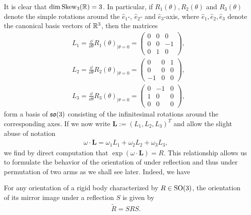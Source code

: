 It is clear that $\dim \operatorname{Skew}_3(\mathbb{R}) = 3$. In particular, if $R_1(\theta), R_2(\theta)$ and $R_3(\theta)$ denote the simple rotations around the $\hat{e}_1$-, $\hat{e}_2$- and $\hat{e}_3$-axis, where $\hat{e}_1, \hat{e}_2, \hat{e}_3$ denote the canonical basis vectors of $\mathbb{R}^3$, then the matrices
\begin{align}
\label{eq: L1}
	&L_1 = \frac{\dd}{\dd\theta}R_1(\theta)_{\mid \theta =0} = \left(\begin{array}{ccc}
	0 & 0 & 0 \\ 
	0 & 0 & -1 \\ 
	0 & 1 & 0
	\end{array}  \right ),\\
\label{eq: L2}
	&L_2 = \frac{\dd}{\dd\theta}R_2(\theta)_{\mid \theta =0} = \left (\begin{array}{ccc}
	0 & 0 & 1 \\ 
	0 & 0 & 0 \\ 
	-1 & 0 & 0
	\end{array}  \right ),\\
\label{eq: L3}
	&L_3 = \frac{\dd}{\dd\theta}R_3(\theta)_{\mid \theta =0} = \left (\begin{array}{ccc}
	0 & -1 & 0 \\ 
	1 & 0 & 0 \\ 
	0 & 0 & 0
	\end{array}  \right ),
\end{align}
form a basis of $\mathfrak{so}(3)$ consisting of the infinitesimal rotations around the corresponding axes. If we now write $\textbf{L} := (L_1, L_2, L_3)^T$ and allow the slight abuse of notation
\begin{align}
	\omega \cdot \mathbf{L} = \omega_1 L_1 + \omega_2 L_2 + \omega_3 L_3,
\end{align}
we find by direct computation that $\exp(\omega \cdot \mathbf{L}) = R$. This relationship allows us to formulate the behavior of the orientation of \spr under reflection and thus under permutation of two arms as we shall see later. Indeed, we have

\begin{lemma}
\label{lem:mirror image of orientation}
For any orientation of a rigid body characterized by $R \in \operatorname{SO}(3)$, the orientation of its mirror image under a reflection $S$ is given by
\begin{align}
	\tilde{R} = S R S.
\end{align}
\end{lemma}

